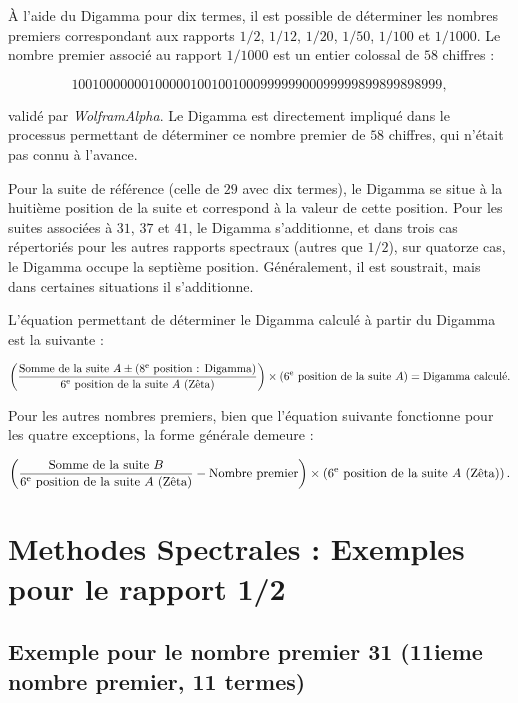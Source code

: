 \documentclass[a4paper,11pt]{article}
\begin{document}
À l'aide du Digamma pour dix termes, il est possible de déterminer les nombres premiers correspondant aux rapports $1/2$, $1/12$, $1/20$, $1/50$, $1/100$ et $1/1000$. Le nombre premier associé au rapport $1/1000$ est un entier colossal de $58$ chiffres :


\[
10010000000100000100100100099999900099999899899898999,
\]


validé par \textit{WolframAlpha}. Le Digamma est directement impliqué dans le processus permettant de déterminer ce nombre premier de $58$ chiffres, qui n'était pas connu à l'avance.

Pour la suite de référence (celle de $29$ avec dix termes), le Digamma se situe à la huitième position de la suite et correspond à la valeur de cette position. Pour les suites associées à $31$, $37$ et $41$, le Digamma s'additionne, et dans trois cas répertoriés pour les autres rapports spectraux (autres que $1/2$), sur quatorze cas, le Digamma occupe la septième position. Généralement, il est soustrait, mais dans certaines situations il s'additionne.

L'équation permettant de déterminer le Digamma calculé à partir du Digamma est la suivante :


\[
\left( \frac{\text{Somme de la suite } A \pm \text{(8\textsuperscript{e} position : Digamma)}}{\text{6\textsuperscript{e} position de la suite } A \text{ (Zêta)}} \right)
\times \left( \text{6\textsuperscript{e} position de la suite } A \right)
= \text{Digamma calculé}.
\]



Pour les autres nombres premiers, bien que l'équation suivante fonctionne pour les quatre exceptions, la forme générale demeure :


\[
\left( 
\frac{\text{Somme de la suite } B}{\text{6\textsuperscript{e} position de la suite } A \text{ (Zêta)}} 
- \text{Nombre premier}
\right)
\times 
\left( \text{6\textsuperscript{e} position de la suite } A \text{ (Zêta)} \right).
\]


\section*{Methodes Spectrales : Exemples pour le rapport 1/2}

\subsection*{Exemple pour le nombre premier 31 (11ieme nombre premier, 11 termes)}
\end{document}
